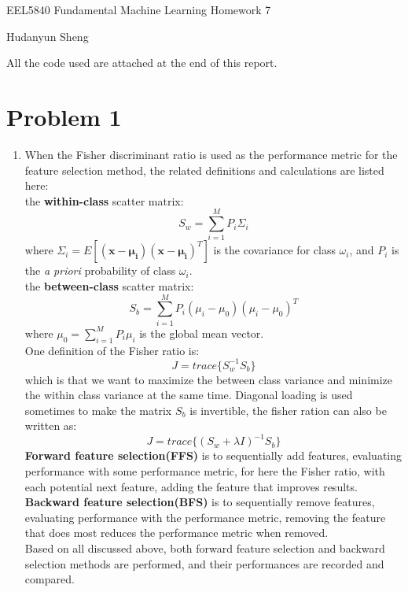 \documentclass[a4paper]{article}
\begin{document}
\begin{spacing}{2.0}
\begin{flushleft}\begin{huge}EEL5840 Fundamental Machine Learning   Homework 7\end{huge}\end{flushleft}
\begin{flushright}\begin{Large} Hudanyun Sheng \end{Large}\end{flushright}

\Large{All the code used are attached at the end of this report.}
\normalsize

\section*{\huge\textbf{ Problem \uppercase\expandafter{1} }  }
\normalsize
\noindent
\begin{enumerate}[(1)]
\item When the Fisher discriminant ratio is used as the performance metric for the feature selection method, the related definitions and calculations are listed here:\\
the \textbf{within-class} scatter matrix: $$S_w = \sum_{i=1}^MP_i\Sigma_i$$
where $\Sigma_i = E[(\mathbf{x-\mu_i})(\mathbf{x-\mu_i})^T]$ is the covariance for class $\omega_i$, and $P_i$ is the \textit{a priori} probability of class $\omega_i$.\\
the \textbf{between-class} scatter matrix: $$S_b = \sum_{i=1}^MP_i(\mu_i-\mu_0)(\mu_i-\mu_0)^T$$
where $\mu_0 = \sum_{i=1}^MP_i\mu_i$ is the global mean vector.\\
One definition of the Fisher ratio is: $$J = trace\{S_w^{-1}S_b\}$$
which is that we want to maximize the between class variance and minimize the within class variance at the same time. Diagonal loading is used sometimes to make the matrix $S_b$ is invertible, the fisher ration can also be written as: $$J = trace\{(S_w+\lambda I)^{-1}S_b\}$$
\textbf{Forward feature selection(FFS)} is to sequentially add features, evaluating performance with some performance metric, for here the Fisher ratio, with each potential next feature, adding the feature that improves results.\\
\textbf{Backward feature selection(BFS)} is to sequentially remove features, evaluating performance with the performance metric, removing the feature that does most reduces the performance metric when removed.\\
Based on all discussed above, both forward feature selection and backward selection methods are performed, and their performances are recorded and compared.\\


\end{enumerate}
\end{spacing}
\end{document}
